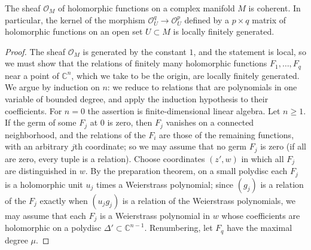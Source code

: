 \begin{theorem}\label{thm:oka-coherence}
The sheaf $\mathcal O_M$ of holomorphic functions on a complex manifold $M$ is coherent. In particular, the kernel of the morphism $\mathcal O_U^q\to\mathcal O_U^p$ defined by a $p\times q$ matrix of holomorphic functions on an open set $U\subset M$ is locally finitely generated.
\end{theorem}
\begin{proof}
The sheaf $\mathcal O_M$ is generated by the constant $1$, and the statement is local, so we must show that the relations of finitely many holomorphic functions $F_1,\ldots,F_q$ near a point of $\mathbb C^n$, which we take to be the origin, are locally finitely generated. We argue by induction on $n$: we reduce to relations that are polynomials in one variable of bounded degree, and apply the induction hypothesis to their coefficients. For $n=0$ the assertion is finite-dimensional linear algebra. Let $n\geq1$. If the germ of some $F_j$ at $0$ is zero, then $F_j$ vanishes on a connected neighborhood, and the relations of the $F_i$ are those of the remaining functions, with an arbitrary $j$th coordinate; so we may assume that no germ $F_j$ is zero (if all are zero, every tuple is a relation). Choose coordinates $(z',w)$ in which all $F_j$ are distinguished in $w$. By the preparation theorem, on a small polydisc each $F_j$ is a holomorphic unit $u_j$ times a Weierstrass polynomial; since $(g_j)$ is a relation of the $F_j$ exactly when $(u_jg_j)$ is a relation of the Weierstrass polynomials, we may assume that each $F_j$ is a Weierstrass polynomial in $w$ whose coefficients are holomorphic on a polydisc $\Delta'\subset\mathbb C^{n-1}$. Renumbering, let $F_q$ have the maximal degree $\mu$.


\end{proof}
